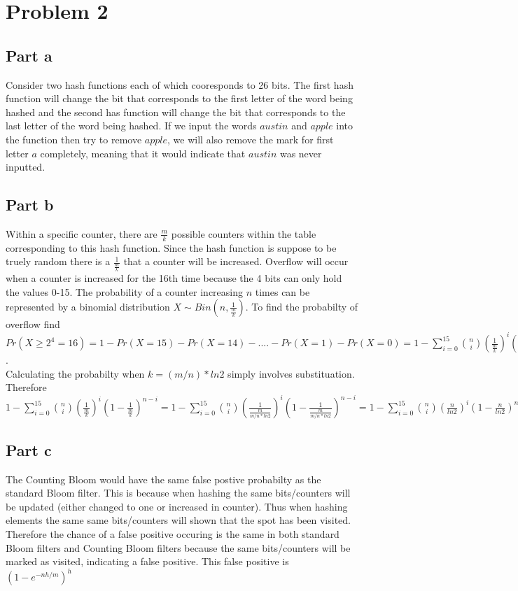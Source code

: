 \documentclass[11pt]{article}
\begin{document}
\section*{Problem 2}
\subsection*{Part a}
Consider two hash functions each of which cooresponds to 26 bits. The first hash function will change the bit that corresponds to the first letter of the word being hashed and the second has function will change the bit that corresponds to the last letter of the word being hashed. If we input the words $austin$ and $apple$ into the function then try to remove $apple$, we will also remove the mark for first letter $a$ completely, meaning that it would indicate that $austin$ was never inputted. 

\subsection*{Part b}
Within a specific counter, there are $\frac{m}{k}$ possible counters within the table corresponding to this hash function. Since the hash function is suppose to be truely random there is a $\frac{1}{\frac{m}{k}}$ that a counter will be increased. Overflow will occur when a counter is increased for the 16th time because the 4 bits can only hold the values 0-15. The probability of a counter increasing $n$ times can be represented by a binomial distribution $X \sim Bin(n, \frac{1}{\frac{m}{k}})$. To find the probabilty of overflow find $Pr(X \geq 2^4 = 16) = 1-Pr(X = 15)- Pr(X=14) - .... - Pr(X =1) - Pr(X=0) = 1 -  \sum_{i=0}^{15} {n \choose i}(\frac{1}{\frac{m}{k}})^i(1-\frac{1}{\frac{m}{k}})^{n-i}$. \\

Calculating the probabilty when $k=(m/n)*ln2$ simply involves substituation. Therefore $1 -  \sum_{i=0}^{15} {n \choose i}(\frac{1}{\frac{m}{k}})^i(1-\frac{1}{\frac{m}{k}})^{n-i} = 1 -  \sum_{i=0}^{15} {n \choose i}(\frac{1}{\frac{m}{m/n*ln2}})^i(1-\frac{1}{\frac{m}{m/n*ln2}})^{n-i} = 1 -  \sum_{i=0}^{15} {n \choose i}(\frac{n}{ln2})^i(1-\frac{n}{ln2})^{n-i}$
\subsection*{Part c}
The Counting Bloom would have the same false postive probabilty as the standard Bloom filter. This is because when hashing the same bits/counters will be updated (either changed to one or increased in counter). Thus when hashing elements the same same bits/counters will shown that the spot has been visited. Therefore the chance of a false positive occuring is the same in both standard Bloom filters and Counting Bloom filters because the same bits/counters will be marked as visited, indicating a false positive. This false positive is $(1-e^{-nh/m})^h$
\end{document}
